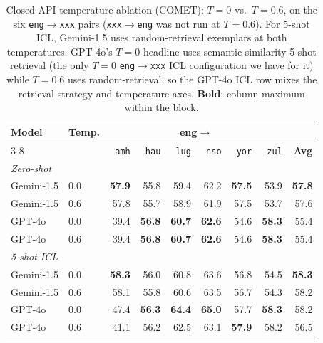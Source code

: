 \begin{table}[t]
\centering
\small
\renewcommand{\arraystretch}{1.05}
\begin{tabular}{llrrrrrrr}
\toprule
\textbf{Model} & \textbf{Temp.} & \multicolumn{6}{c}{\textbf{eng$\to$}} & \\
\cmidrule(lr){3-8}
   &    & \texttt{amh} & \texttt{hau} & \texttt{lug} & \texttt{nso} & \texttt{yor} & \texttt{zul} & \textbf{Avg} \\
\midrule
\multicolumn{9}{l}{\textit{Zero-shot}} \\
\midrule
Gemini-1.5 & 0.0 & \textbf{57.9} & 55.8 & 59.4 & 62.2 & \textbf{57.5} & 53.9 & \textbf{57.8} \\
Gemini-1.5 & 0.6 & 57.8 & 55.7 & 58.9 & 61.9 & 57.5 & 53.7 & 57.6 \\
GPT-4o & 0.0 & 39.4 & \textbf{56.8} & \textbf{60.7} & \textbf{62.6} & 54.6 & \textbf{58.3} & 55.4 \\
GPT-4o & 0.6 & 39.4 & \textbf{56.8} & \textbf{60.7} & \textbf{62.6} & 54.6 & \textbf{58.3} & 55.4 \\
\midrule
\midrule
\multicolumn{9}{l}{\textit{5-shot ICL}} \\
\midrule
Gemini-1.5 & 0.0 & \textbf{58.3} & 56.0 & 60.8 & 63.6 & 56.8 & 54.5 & \textbf{58.3} \\
Gemini-1.5 & 0.6 & 58.1 & 55.8 & 60.6 & 63.5 & 56.7 & 54.3 & 58.2 \\
GPT-4o & 0.0 & 47.4 & \textbf{56.3} & \textbf{64.4} & \textbf{65.0} & 57.7 & \textbf{58.3} & 58.2 \\
GPT-4o & 0.6 & 41.1 & 56.2 & 62.5 & 63.1 & \textbf{57.9} & 58.2 & 56.5 \\
\bottomrule
\end{tabular}
\caption{Closed-API temperature ablation (COMET): $T{=}0$ vs.\ $T{=}0.6$, on the six \texttt{eng}$\to$\texttt{xxx} pairs (\texttt{xxx}$\to$\texttt{eng} was not run at $T{=}0.6$). For 5-shot ICL, Gemini-1.5 uses random-retrieval exemplars at both temperatures. GPT-4o's $T{=}0$ headline uses semantic-similarity 5-shot retrieval (the only $T{=}0$ \texttt{eng}$\to$\texttt{xxx} ICL configuration we have for it) while $T{=}0.6$ uses random-retrieval, so the GPT-4o ICL row mixes the retrieval-strategy and temperature axes. \textbf{Bold}: column maximum within the block.}
\label{tab:temp_ablation_comet}
\end{table}
